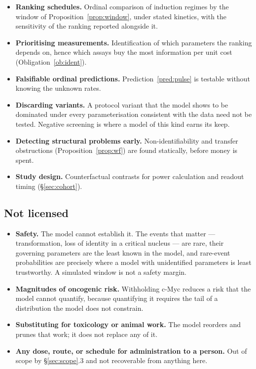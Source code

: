 \documentclass[11pt,a4paper]{article}
\theoremstyle{plain}
\theoremstyle{definition}
\theoremstyle{remark}
\begin{document}
\begin{itemize}[leftmargin=1.4em,itemsep=3pt]
\item \textbf{Ranking schedules.} Ordinal comparison of induction regimes by
the window of Proposition~\ref{prop:window}, under stated kinetics, with the
sensitivity of the ranking reported alongside it.
\item \textbf{Prioritising measurements.} Identification of which parameters
the ranking depends on, hence which assays buy the most information per unit
cost (Obligation~\ref{ob:ident}).
\item \textbf{Falsifiable ordinal predictions.} Prediction~\ref{pred:pulse} is
testable without knowing the unknown rates.
\item \textbf{Discarding variants.} A protocol variant that the model shows to
be dominated under every parameterisation consistent with the data need not be
tested. Negative screening is where a model of this kind earns its keep.
\item \textbf{Detecting structural problems early.} Non-identifiability and
transfer obstructions (Proposition~\ref{prop:wf}) are found statically,
before money is spent.
\item \textbf{Study design.} Counterfactual contrasts for power calculation
and readout timing (\S\ref{sec:cohort}).
\end{itemize}

\subsection{Not licensed}

\begin{itemize}[leftmargin=1.4em,itemsep=3pt]
\item \textbf{Safety.} The model cannot establish it. The events that matter
--- transformation, loss of identity in a critical nucleus --- are rare, their
governing parameters are the least known in the model, and rare-event
probabilities are precisely where a model with unidentified parameters is
least trustworthy. A simulated window is not a safety margin.
\item \textbf{Magnitudes of oncogenic risk.} Withholding c-Myc reduces a risk
that the model cannot quantify, because quantifying it requires the tail of a
distribution the model does not constrain.
\item \textbf{Substituting for toxicology or animal work.} The model reorders
and prunes that work; it does not replace any of it.
\item \textbf{Any dose, route, or schedule for administration to a person.}
Out of scope by \S\ref{sec:scope}.3 and not recoverable from anything here.
\end{itemize}
\end{document}
